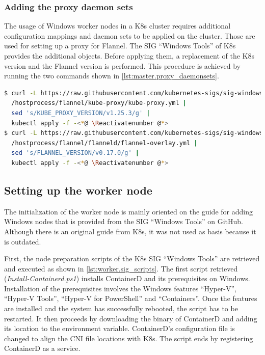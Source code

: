 \subsubsection{Adding the proxy daemon sets}
The usage of \ac{Windows} worker nodes in a \ac{K8s} cluster requires additional configuration mappings and daemon sets to be applied on the cluster. Those are used for setting up a proxy for Flannel. The \ac{SIG} \enquote{Windows Tools} of \ac{K8s} provides the additional objects\cite{GitHubKubernetesSIGWindowsTools.20230213}. Before applying them, a replacement of the \ac{K8s} version and the Flannel version is performed. This procedure is achieved by running the two commands shown in \autoref{lst:master.proxy_daemonsets}. 
\begin{lstlisting}[label=lst:master.proxy_daemonsets, caption={Bash command for adding the flannel overlay configuration\cite{GitHubKubernetesSIGWindowsTools.20230213}}, language=bash]
$ curl -L https://raw.githubusercontent.com/kubernetes-sigs/sig-windows-tools/master \<*@ \Suppressnumber @*>
  /hostprocess/flannel/kube-proxy/kube-proxy.yml | 
  sed 's/KUBE_PROXY_VERSION/v1.25.3/g' | 
  kubectl apply -f -<*@ \Reactivatenumber @*>
$ curl -L https://raw.githubusercontent.com/kubernetes-sigs/sig-windows-tools/master \<*@ \Suppressnumber @*>
  /hostprocess/flannel/flanneld/flannel-overlay.yml | 
  sed 's/FLANNEL_VERSION/v0.17.0/g' | 
  kubectl apply -f -<*@ \Reactivatenumber @*>
\end{lstlisting}


\subsection{Setting up the worker node}\label{chap:implementation.setup_worker}
The initialization of the worker node is mainly oriented on the guide for adding \ac{Windows} nodes that is provided from the \ac{SIG} \enquote{Windows Tools} on GitHub\cite{GitHubKubernetesSIGWindowsTools.20230213}. Although there is an original guide from \ac{K8s}\cite{Kubernetes.20220419}, it was not used as basis because it is outdated.

First, the node preparation scripts of the \ac{K8s} \ac{SIG} \enquote{Windows Tools} are retrieved and executed as shown in \autoref{lst:worker.sig_scripts}. The first script retrieved (\textit{Install-Containerd.ps1}) installs ContainerD and its prerequisites on \ac{Windows}. Installation of the prerequisites involves the Windows features \enquote{Hyper-V}, \enquote{Hyper-V Tools}, \enquote{Hyper-V for PowerShell} and \enquote{Containers}. Once the features are installed and the system has successfully rebooted, the script has to be restarted. It then proceeds by downloading the binary of ContainerD and adding its location to the  environment variable. ContainerD's configuration file is changed to align the \ac{CNI} file locations with \ac{K8s}. The script ends by registering ContainerD as a service.


